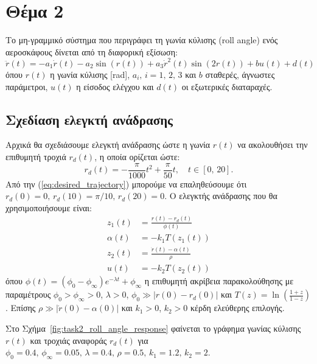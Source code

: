 \documentclass[a4paper,12pt]{article}
\begin{document}
\section*{Θέμα 2}

Το μη-γραμμικό σύστημα που περιγράφει τη γωνία κύλισης 
(roll angle) ενός αεροσκάφους δίνεται από τη διαφορική εξίσωση:
\begin{equation*}
    \ddot{r}(t) = -a_1 \dot{r}(t) - a_2 \sin(r(t)) + a_3 \dot{r}^2(t) \sin(2r(t)) + b u(t) + d(t)
\end{equation*}
όπου $r(t)$ η γωνία κύλισης [rad],
$a_i, \, i = 1,\,2,\,3$ και $b$ σταθερές, άγνωστες παράμετροι, $u(t)$ η είσοδος ελέγχου και $d(t)$
οι εξωτερικές διαταραχές.

\subsection*{Σχεδίαση ελεγκτή ανάδρασης}

Αρχικά θα σχεδιάσουμε ελεγκτή ανάδρασης ώστε η γωνία $r(t)$ να ακολουθήσει την επιθυμητή τροχιά $r_d(t)$, η
οποία ορίζεται ώστε:
\begin{equation}
    r_d(t) = -\frac{\pi}{1000}t^2 + \frac{\pi}{50}t, \quad t \in [0,\,20].
    \label{eq:desired_trajectory}
\end{equation}
Από την (\ref{eq:desired_trajectory}) μπορούμε να επαληθεύσουμε ότι 
$r_d(0) = 0, \, r_d(10) = \pi / 10, \, r_d(20) = 0$.
Ο ελεγκτής ανάδρασης που θα χρησιμοποιήσουμε είναι:
\begin{equation*}
    \begin{aligned}
    z_1(t) &= \frac{r(t) - r_d(t)}{\phi(t)} \\
    \alpha(t) &= -k_1 T(z_1(t)) \\
    z_2(t) &= \frac{\dot{r}(t) - \alpha(t)}{\rho} \\
    u(t) &= -k_2 T(z_2(t))
    \end{aligned}
\end{equation*}
όπου $\phi(t) = (\phi_0 - \phi_\infty) e^{-\lambda t} + \phi_\infty$ η επιθυμητή ακρίβεια παρακολούθησης
με παραμέτρους $\phi_0 > \phi_{\infty} > 0$, $\lambda > 0$, $\phi_0 \gg |r(0) - r_d(0)|$ και
$T(z) = \ln\left( \frac{1+z}{1-z} \right)$. Επίσης $\rho \gg |\dot{r}(0) - \alpha(0)|$ και $k_1 > 0$, $k_2 > 0$
κέρδη ελεύθερης επιλογής.

Στο Σχήμα~\ref{fig:task2_roll_angle_response} φαίνεται το γράφημα γωνίας κύλισης $r(t)$ και τροχιάς αναφοράς
$r_d(t)$ για $\phi_0 = 0.4, \, \phi_{\infty} = 0.05, \, \lambda = 0.4, \, \rho = 0.5, \, k_1 = 1.2, \,
k_2 = 2$.
\end{document}
